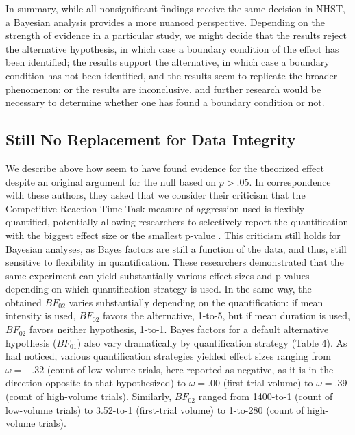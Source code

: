 \documentclass[fignum,nobf,man]{apa}
\begin{document}
In summary, while all nonsignificant findings receive the same decision in NHST, a Bayesian analysis provides a more nuanced perspective. Depending on the strength of evidence in a particular study, we might decide that the results reject the alternative hypothesis, in which case a boundary condition of the effect has been identified; the results support the alternative, in which case a boundary condition has not been identified, and the results seem to replicate the broader phenomenon; or the results are inconclusive, and further research would be necessary to determine whether one has found a boundary condition or not.

\subsection{Still No Replacement for Data Integrity} %
We describe above how \citet{Elson:etal:2013} seem to have found evidence for the theorized effect despite an original argument for the null based on $p > .05$. In correspondence with these authors, they asked that we consider their criticism that the Competitive Reaction Time Task measure of aggression %
used is flexibly quantified, potentially allowing researchers to selectively report the quantification with the biggest effect size or the smallest p-value \citep{Elson:etal:2014}. This criticism still holds for Bayesian analyses, as Bayes factors are still a function of the data, and thus, still sensitive to flexibility in quantification. These researchers demonstrated that the same experiment can yield substantially various effect sizes and p-values depending on which quantification strategy is used. In the same way, the obtained $BF_{02}$ varies substantially depending on the quantification: if mean intensity is used, $BF_{02}$ favors the alternative, 1-to-5, but if mean duration is used, $BF_{02}$ favors neither hypothesis, 1-to-1. Bayes factors for a default alternative hypothesis ($BF_{01}$) also vary dramatically by quantification strategy (Table 4). As \citet{Elson:etal:2014} had noticed, various quantification strategies yielded effect sizes ranging from $\omega = -.32$ (count of low-volume trials, here reported as negative, as it is in the direction opposite to that hypothesized) to $\omega = .00$ (first-trial volume) to $\omega = .39$ (count of high-volume trials). Similarly, $BF_{02}$ ranged from 1400-to-1 (count of low-volume trials) to 3.52-to-1 (first-trial volume) to 1-to-280 (count of high-volume trials).
\end{document}
